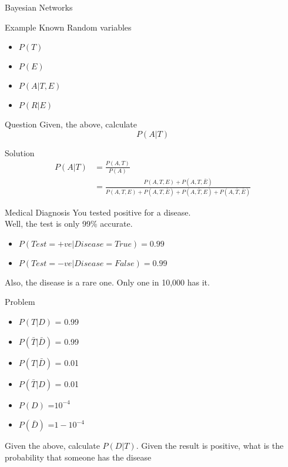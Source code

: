 \documentclass{beamer}
\begin{document}
\begin{frame}{Bayesian Networks}
\end{frame}


\begin{frame}{Example}
    Known Random variables
    \begin{itemize}
        \item $P(T)$
        \item $P(E)$
        \item $P(A|T,E)$
        \item $P(R|E)$
    \end{itemize}
\end{frame}


\begin{frame}{Question}
    Given, the above, calculate
    \begin{equation*}
        P(A|T)
    \end{equation*}
\end{frame}

\begin{frame}{Solution}
    \[
        \begin{split}
            P(A|T) &= \frac{P(A,T)}{P(A)}\\
            &=\frac{P(A,T,E)+P(A,T,\bar{E})}{P(A,T,E)+P(A,T,\bar{E}) + P(A,\bar{T},E)+P(A,\bar{T},\bar{E})}
        \end{split}
    \]
\end{frame}

\begin{frame}{Medical Diagnosis}
    You tested positive for a disease.\\
    Well, the test is only 99\% accurate.\\
    \begin{itemize}
        \item $P(Test = +ve | Disease = True) = 0.99$
        \item $P(Test = -ve | Disease = False) = 0.99$
    \end{itemize}
    Also, the disease is a rare one. Only one in 10,000 has it.
\end{frame}

\begin{frame}{Problem}
    \begin{itemize}
        \item $P(T|D)$ = 0.99
        \item $P(\bar{T}|\bar{D})$ = 0.99
        \item $P(T|\bar{D})$ = 0.01
        \item $P(\bar{T}|D)$ = 0.01
        \item $P(D)$ =$ 10^{-4}$
        \item $P(\bar{D})$ =$ 1 - 10^{-4}$
    \end{itemize}
    
    Given the above, calculate $P(D|T)$. Given the result is positive, what is the probability that someone has the disease
\end{frame}
\end{document}
